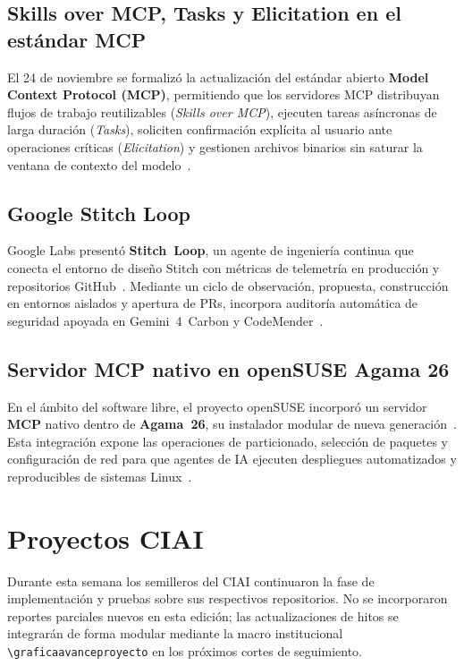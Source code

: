 \documentclass[conference,twocolumn,spanish]{IEEEtran}
\newcommand{\graficaavanceproyecto}[3]{%
\begin{figure}[htbp]
\centering
\begin{tikzpicture}
\begin{axis}[
    xbar,
    width=0.92\columnwidth,
    height=3.6cm,
    bar width=7pt,
    xlabel={Porcentaje de avance (\%)},
    xmin=0,
    xmax=114,
    xtick={0,25,50,75,100},
    symbolic y coords={#2},
    ytick=data,
    tick label style={font=\scriptsize},
    label style={font=\scriptsize},
    xmajorgrids=true,
    grid style={dashed, gray!35},
    nodes near coords={\pgfmathprintnumber{\pgfplotspointmeta}\%},
    every node near coord/.append style={font=\tiny, anchor=west}
]
\addplot[fill=green!55!black, draw=green!70!black] coordinates {#3};
\end{axis}
\end{tikzpicture}
\caption{Porcentaje de avance por hitos: #1.}
\end{figure}
}
\begin{document}
\subsection{Skills over MCP, Tasks y Elicitation en el estándar MCP}
El 24 de noviembre se formalizó la actualización del estándar abierto \textbf{Model Context Protocol (MCP)}, permitiendo que los servidores MCP distribuyan flujos de trabajo reutilizables (\textit{Skills over MCP}), ejecuten tareas asíncronas de larga duración (\textit{Tasks}), soliciten confirmación explícita al usuario ante operaciones críticas (\textit{Elicitation}) y gestionen archivos binarios sin saturar la ventana de contexto del modelo~\cite{anthropic_skills_mcp_2026,codesprint_skills_mcp_2026}.

\subsection{Google Stitch Loop}
Google Labs presentó \textbf{Stitch~Loop}, un agente de ingeniería continua que conecta el entorno de diseño Stitch con métricas de telemetría en producción y repositorios GitHub~\cite{datastudios_stitch_loop_2026,sharjah24_stitch_loop_2026}. Mediante un ciclo de observación, propuesta, construcción en entornos aislados y apertura de PRs, incorpora auditoría automática de seguridad apoyada en Gemini~4~Carbon y CodeMender~\cite{datastudios_stitch_loop_2026}.

\subsection{Servidor MCP nativo en openSUSE Agama 26}
En el ámbito del software libre, el proyecto openSUSE incorporó un servidor \textbf{MCP} nativo dentro de \textbf{Agama~26}, su instalador modular de nueva generación~\cite{linuxiac_agama26_mcp_2026}. Esta integración expone las operaciones de particionado, selección de paquetes y configuración de red para que agentes de IA ejecuten despliegues automatizados y reproducibles de sistemas Linux~\cite{linuxiac_agama26_mcp_2026}.

\section{Proyectos CIAI}

Durante esta semana los semilleros del CIAI continuaron la fase de implementación y pruebas sobre sus respectivos repositorios. No se incorporaron reportes parciales nuevos en esta edición; las actualizaciones de hitos se integrarán de forma modular mediante la macro institucional \verb|\graficaavanceproyecto| en los próximos cortes de seguimiento.
\end{document}
